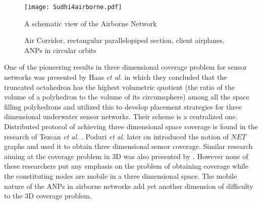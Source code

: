 \documentclass[10pt]{IEEEtran}
\begin{document}
\begin{center}
\begin{figure*}[tbh]
    \begin{minipage}[tbh]{0.6\linewidth}
        \centering
       	\texttt{[image: Sudhi4airborne.pdf]}
	\caption{A schematic view of the Airborne Network }
	\label{fig:airborne}
    \end{minipage}
    \hfill
    \begin{minipage}[tbh]{0.35\linewidth}
        \centering
	\hfill
	\hfill
	\caption{Air Corridor, rectangular parallelopiped section, client airplanes, ANPs in circular orbits}
	\label{fig:airCorridor}
    \end{minipage}
\end{figure*}
\end{center}

One of the pioneering results in three dimensional coverage problem for sensor networks was presented by Haas {\em et al.} \cite{HAAS08,HAAS06} in which they concluded that the truncated octahedron has the highest volumetric quotient (the ratio of the volume of a polyhedron to the volume of its circumsphere) among all the space filling polyhedrons and utilized this to develop placement strategies for three dimensional underwater sensor networks. Their scheme is a centralized one. Distributed protocol of achieving three dimensional space coverage is found in the research of Tezcan {\em et al.} \cite{TEZ04}. Poduri {\em et al.} \cite{POD06} later on introduced the notion of $NET$ graphs and used it to obtain three dimensional sensor coverage. Similar research aiming at the coverage problem in 3D was also presented by \cite{CHEN08, LEI07, HUANG04}. However none of these researchers put any emphasis on the problem of obtaining coverage while the constituting nodes are mobile in a three dimensional space. The mobile nature of the ANPs in airborne networks add yet another dimension of difficulty to the 3D coverage problem.
\end{document}
